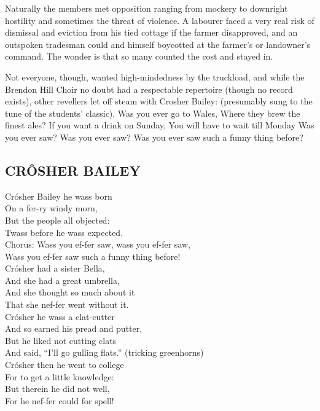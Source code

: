\documentclass[10pt,a4paper]{article}
\begin{document}
Naturally the members met opposition ranging from mockery to downright hostility and sometimes the threat of violence. A labourer faced a very real risk of dismissal and eviction from his tied cottage if the farmer disapproved, and an outspoken tradesman could and himself boycotted at the farmer’s or landowner’s command. The wonder is that so many counted the cost and stayed in.

Not everyone, though, wanted high-mindedness by the truckload, and while the Brendon Hill Choir no doubt had a respectable repertoire (though no record exists), other revellers let off steam with Crosher Bailey:  (presumably sung to the tune of the students’ classic). 
  Was you ever go to Wales, Where they brew the finest ales? 
  If you want a drink on Sunday, You will have to wait till Monday
  Was you ever saw? Was you ever saw? Was you ever saw such a funny thing before?
 

\subsection{CRÔSHER BAILEY}

Crósher Bailey he wass born \\
On a fer-ry windy morn, \\
But the people all objected: \\
Twass before he wass expected. \\

Chorus: Wass you ef-fer saw, wass you ef-fer saw,  \\
   	Wass you ef-fer saw    such a funny thing before!  \\
Crósher had a sister Bella, \\
 		And she had a great umbrella, \\
And she thought so much about it \\
That she nef-fer went without it. \\

Crósher he wass a clat-cutter \\
And so earned his pread and putter,  \\
But he liked not cutting clats \\
And said, “I’ll go gulling flats.”  (tricking greenhorns) \\

Crósher then he went to college \\
For to get a little knowledge: \\
But therein he did not well, \\
For he nef-fer could for spell! \\
 	
\end{document}
